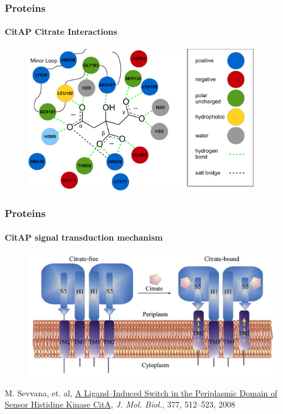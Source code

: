 \documentclass[english]{beamer}
\begin{document}

\begin{frame}
    \frametitle{Proteins}
    \framesubtitle{CitAP Citrate Interactions}

    \begin{figure}
        \includegraphics[width=0.9\textwidth]{figures/citrate_interactions/citrate_interactions.pdf}
    \end{figure}     
\end{frame}      


\begin{frame}
    \frametitle{Proteins}
    \framesubtitle{CitAP signal transduction mechanism}
    \begin{figure}
        \includegraphics[width=.9\linewidth]{figures/CitA_mechanism.png}
    \end{figure}      

    \tiny
    M. Sevvana, et. al,
    \href{http://www.sciencedirect.com/science/article/pii/S0022283608000466}
    {A Ligand--Induced Switch in the Periplasmic Domain of Sensor Histidine Kinase CitA},
    \textit{J. Mol. Biol.}, 377, 512--523, 2008

\end{frame}  
\end{document}
